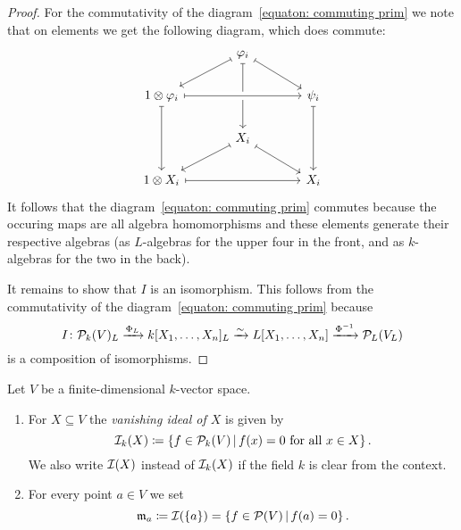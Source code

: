 \begin{proof}
    For the commutativity of the diagram~\eqref{equaton: commuting prim} we note that on elements we get the following diagram, which does commute:
    \[
      \begin{tikzcd}[column sep = large]
          {}
        & \varphi_i
          \arrow[mapsto]{dl}
          \arrow[mapsto]{dr}
          \arrow[mapsto]{dd}
        & {}
        \\
          1 \otimes \varphi_i
          \arrow[crossing over, mapsto]{rr}
          \arrow[mapsto]{dd}
        & {}
        & \psi_i
          \arrow[mapsto]{dd}
        \\
          {}
        & X_i
          \arrow[mapsto]{dl}
          \arrow[mapsto]{dr}
        & {}
        \\
          1 \otimes X_i
          \arrow[mapsto]{rr}
        & {}
        & X_i
      \end{tikzcd}
    \]
    It follows that the diagram~\eqref{equaton: commuting prim} commutes because the occuring maps are all algebra homomorphisms and these elements generate their respective algebras (as $L$-algebras for the upper four in the front, and as $k$-algebras for the two in the back).
    
    It remains to show that $I$ is an isomorphism.
    This follows from the commutativity of the diagram~\eqref{equaton: commuting prim} because
    \[
                              I
      \colon                  \mathcal{P}_k(V)_L
      \xrightarrow{\Phi_L}    k[X_1, \dotsc, X_n]_L
      \xrightarrow{\sim}      L[X_1, \dotsc, X_n]
      \xrightarrow{\Phi^{-1}} \mathcal{P}_L(V_L)
    \]
    is a composition of isomorphisms.
\end{proof}


\begin{definition}
  Let $V$ be a finite-dimensional $k$-vector space.
  \begin{enumerate}
    \item
      For $X \subseteq V$ the \emph{vanishing ideal of $X$} is given by
      \[
        \mc{I}_k(X)
        \coloneqq \{
                    f \in \mc{P}_k(V)
                  \suchthat
                    \text{$f(x) = 0$ for all $x \in X$}
                  \} \,.
      \]
      We also write $\mathcal{I}(X)$ instead of $\mathcal{I}_k(X)$ if the field $k$ is clear from the context.
    \item
      For every point $a \in V$ we set
      \[
                  \mf{m}_a
        \coloneqq \mc{I}(\{a\})
        =         \{
                    f \in \mc{P}(V)
                  \suchthat
                    f(a) = 0
                  \} \,.
      \]
  \end{enumerate}
\end{definition}


